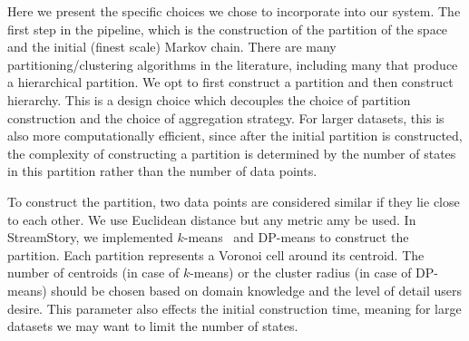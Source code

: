 Here we present the specific choices we chose to incorporate into our system.  
%
%
The first step in the pipeline, which is the construction of the partition of the space and the initial (finest scale) Markov chain.
There are many partitioning/clustering algorithms in the literature, including many that produce a hierarchical partition.%
We opt to first construct a partition and then construct hierarchy. This is a design choice which decouples the choice of partition construction and the choice of aggregation strategy.  For larger datasets, this is also more computationally efficient, since after the initial partition is constructed, the complexity of constructing a partition is determined by the number of states in this partition rather than the number of data points.  	


To construct the partition, two data points are considered similar if they lie close
to each other. We use Euclidean distance but any metric amy be used.
%
In StreamStory, we implemented $k$-means~\cite{Maimon:2005:DMK:1088958} and DP-means \cite{DBLP:journals/corr/abs-1111-0352} to construct the partition. Each  
partition  represents a  Voronoi cell around its centroid. 
%
%
The number of centroids (in case of $k$-means) or the cluster radius (in case of DP-means) should
be chosen based on domain knowledge and the level of detail users desire. This parameter also effects the 
initial construction time, meaning for large datasets we may want to limit the number of states.

